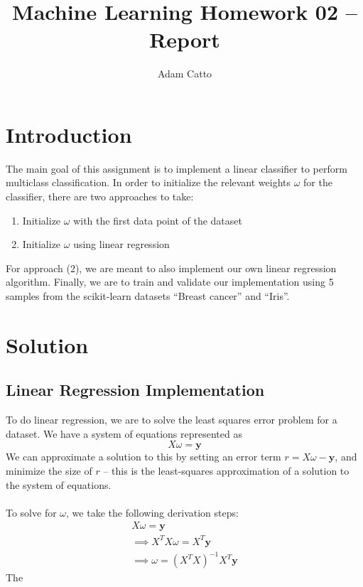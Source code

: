 \documentclass[11pt]{article}
\title{Machine Learning Homework 02 – Report}
\author{Adam Catto}
\date{ }
\begin{document}
\maketitle
\section{Introduction}
The main goal of this assignment is to implement a linear classifier to perform multiclass classification. In order to initialize the relevant weights $\omega$ for the classifier, there are two approaches to take: 
\begin{enumerate}
	\item Initialize $\omega$ with the first data point of the dataset
	\item Initialize $\omega$ using linear regression
\end{enumerate}
For approach (2), we are meant to also implement our own linear regression algorithm. Finally, we are to train and validate our implementation using 5 samples from the scikit-learn datasets ``Breast cancer'' and ``Iris''.

\section{Solution}

\subsection{Linear Regression Implementation}
To do linear regression, we are to solve the least squares error problem for a dataset. We have a system of equations represented as 
$$ X\omega = \mathbf{y}$$We can approximate a solution to this by setting an error term $r = X\omega - \mathbf{y}$, and minimize the size of $r$ – this is the least-squares approximation of a solution to the system of equations.\\ 
 \\
To solve for $\omega$, we take the following derivation steps:
\begin{gather}
X\omega = \mathbf{y} \\
 \implies X^T X\omega = X^T \mathbf{y}\\
  \implies \omega = (X^T X)^{-1} X^T \mathbf{y}
\end{gather}
The 
\end{document}
